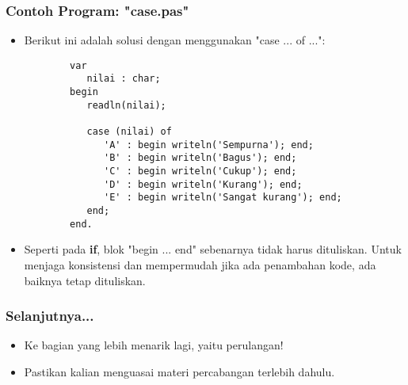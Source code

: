 \documentclass{beamer}
\begin{document}
\begin{frame}[fragile]
\frametitle{Contoh Program: "case.pas"}
\begin{itemize}
    \item Berikut ini adalah solusi dengan menggunakan "case ... of ...":
    \begin{lstlisting}
        var
           nilai : char;
        begin
           readln(nilai);

           case (nilai) of
              'A' : begin writeln('Sempurna'); end;
              'B' : begin writeln('Bagus'); end;
              'C' : begin writeln('Cukup'); end;
              'D' : begin writeln('Kurang'); end;
              'E' : begin writeln('Sangat kurang'); end;
           end;
        end.
    \end{lstlisting}
    \item Seperti pada \textbf{if}, blok "begin ... end" sebenarnya tidak harus dituliskan. Untuk menjaga konsistensi dan mempermudah \newline jika ada penambahan kode, ada baiknya tetap dituliskan.
\end{itemize}
\end{frame}

\begin{frame}
\frametitle{Selanjutnya...}
\begin{itemize}
    \item Ke bagian yang lebih menarik lagi, yaitu perulangan!
    \item Pastikan kalian menguasai materi percabangan terlebih dahulu.
\end{itemize}
\end{frame}
\end{document}
